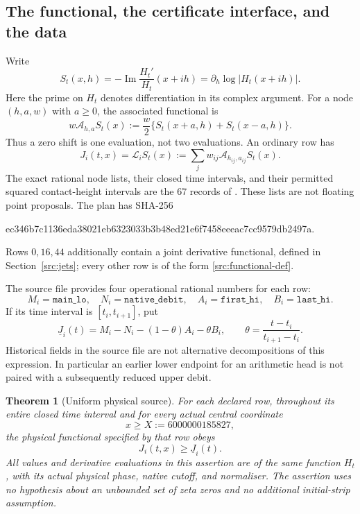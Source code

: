 \documentclass[11pt,a4paper]{article}
\newtheorem{theorem}{Theorem}[section]
\theoremstyle{definition}
\theoremstyle{remark}
\begin{document}
\subsection{The functional, the certificate interface, and the data}
\label{src:functional}

Write
\[
 S_t(x,h)=-\operatorname{Im}\frac{H_t'}{H_t}(x+ih)
       =\partial_h\log|H_t(x+ih)|.
\]
Here the prime on $H_t$ denotes differentiation in its complex argument.
For a node $(h,a,w)$ with $a\geq0$, the associated functional is
\[
 w\mathcal A_{h,a}S_t(x)
   :=\frac w2\{S_t(x+a,h)+S_t(x-a,h)\}.
\]
Thus a zero shift is one evaluation, not two evaluations.  An ordinary row
has
\begin{equation}
 J_i(t,x)=\mathcal L_i S_t(x)
       :=\sum_j w_{ij}\mathcal A_{h_{ij},a_{ij}}S_t(x).
 \label{src:functional-def}
\end{equation}
The exact rational node lists, their closed time intervals, and their
permitted squared contact-height intervals are the $67$ records of
.  These lists are not floating point proposals.
The plan has SHA-256
\begin{center}\footnotesize\ttfamily
 ec346b7c1136eda38021eb6323033b3b48ed21e6f7458eeeac7cc9579db2497a.
\end{center}
Rows $0,16,44$ additionally contain a joint derivative functional, defined
in Section~\ref{src:jets}; every other row is of the form
\eqref{src:functional-def}.

The source file  provides four operational
rational numbers for each row:
\[
 M_i=\texttt{main\_lo},\quad N_i=\texttt{native\_debit},\quad
 A_i=\texttt{first\_hi},\quad B_i=\texttt{last\_hi}.
\]
If its time interval is $[t_i,t_{i+1}]$, put
\begin{equation}
 \underline J_i(t)=M_i-N_i-(1-\theta)A_i-\theta B_i,
 \qquad \theta=\frac{t-t_i}{t_{i+1}-t_i}.
 \label{src:operational}
\end{equation}
Historical fields in the source file are not alternative decompositions
of this expression.  In particular an earlier lower endpoint for an
arithmetic head is not paired with a subsequently reduced upper debit.

\begin{theorem}[Uniform physical source]\label{src:source}
For each declared row, throughout its entire closed time interval and
for every actual central coordinate
\[
 x\geq X:=6000000185827,
\]
the physical functional specified by that row obeys
\[
 J_i(t,x)\geq\underline J_i(t).
\]
All values and derivative evaluations in this assertion are of the same
function $H_t$, with its actual physical phase, native cutoff, and
normaliser.  The assertion uses no hypothesis about an unbounded set of
zeta zeros and no additional initial-strip assumption.
\end{theorem}
\end{document}
